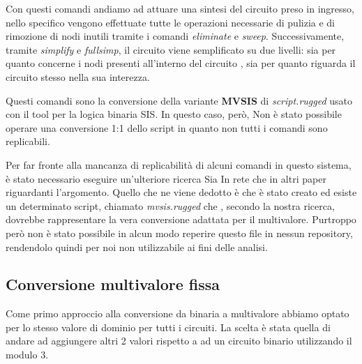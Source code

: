 \documentclass[
]{book}
\begin{document}
Con questi comandi andiamo ad attuare una sintesi del circuito preso in ingresso, nello specifico vengono effettuate tutte le operazioni necessarie di pulizia e di rimozione di nodi inutili tramite i comandi \emph{eliminate} e \emph{sweep}. Successivamente, tramite \emph{simplify} e \emph{fullsimp}, il circuito viene semplificato su due livelli: sia per quanto concerne i nodi presenti all'interno del circuito , sia per quanto riguarda il circuito stesso nella sua interezza.

Questi comandi sono la conversione della variante \textbf{MVSIS} di \emph{script.rugged} usato con il tool per la logica binaria SIS. In questo caso, però, Non è stato possibile operare una conversione 1:1 dello script in quanto non tutti i comandi sono replicabili.

Per far fronte alla mancanza di replicabilità di alcuni comandi in questo sistema, è stato necessario eseguire un'ulteriore ricerca Sia In rete che in altri paper riguardanti l'argomento. Quello che ne viene dedotto è che è stato creato ed esiste un determinato script, chiamato \emph{mvsis.rugged} che , secondo la nostra ricerca, dovrebbe rappresentare la vera conversione adattata per il multivalore. Purtroppo però non è stato possibile in alcun modo reperire questo file in nessun repository, rendendolo quindi per noi non utilizzabile ai fini delle analisi.

\newpage

\hypertarget{conversione-multivalore-fissa}{%
\subsection{Conversione multivalore fissa}\label{conversione-multivalore-fissa}}

Come primo approccio alla conversione da binaria a multivalore abbiamo optato per lo stesso valore di dominio per tutti i circuiti. La scelta è stata quella di andare ad aggiungere altri 2 valori rispetto a ad un circuito binario utilizzando il modulo 3.
\end{document}
